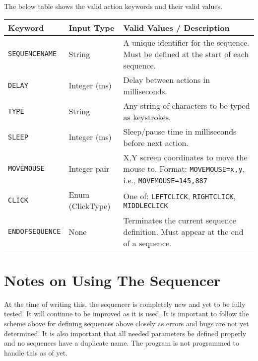 The below table shows the valid action keywords and their valid values.

\begin{table}[h]
	\centering
	\label{tab:sequencer_keywords}
	\begin{tabularx}{\textwidth}{|l|l|X|}
		\hline
		\textbf{Keyword} & \textbf{Input Type} & \textbf{Valid Values / Description} \\
		\hline
		\texttt{SEQUENCENAME} & String & A unique identifier for the sequence. Must be defined at the start of each sequence. \\
		\hline
		\texttt{DELAY} & Integer (ms) & Delay between actions in milliseconds.  \\
		\hline
		\texttt{TYPE} & String & Any string of characters to be typed as keystrokes. \\
		\hline
		\texttt{SLEEP} & Integer (ms) & Sleep/pause time in milliseconds before next action. \\
		\hline
		\texttt{MOVEMOUSE} & Integer pair & X,Y screen coordinates to move the mouse to. Format: \texttt{MOVEMOUSE=x,y}, i.e., \texttt{MOVEMOUSE=145,887} \\
		\hline
		\texttt{CLICK} & Enum (ClickType) & One of: \texttt{LEFTCLICK}, \texttt{RIGHTCLICK}, \texttt{MIDDLECLICK} \\
		\hline
		\texttt{ENDOFSEQUENCE} & None & Terminates the current sequence definition. Must appear at the end of a sequence. \\
		\hline
	\end{tabularx}
\end{table}


\section{Notes on Using The Sequencer}

At the time of writing this, the sequencer is completely new and yet to be fully tested. It will continue to be improved as it is used. It is important to follow the scheme above for defining sequences above closely as errors and bugs are not yet determined. It is also important that all needed parameters be defined properly and no sequences have a duplicate name. The program is not programmed to handle this as of yet.
